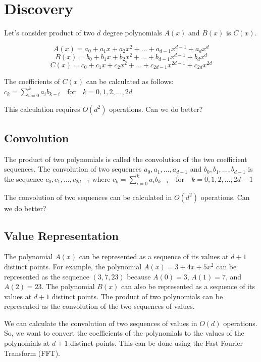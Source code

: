 \documentclass{report}
\begin{document}
\tableofcontents

\newpage
\chapter{Discovery}
Let's consider product of two \(d\) degree polynomials \(A(x)\) and \(B(x)\) is \(C(x)\).

$$
A(x) = a_0 + a_1x + a_2x^2 + \ldots + a_{d-1}x^{d-1} + a_dx^d 
$$	
$$ B(x) = b_0 + b_1x + b_2x^2 + \ldots + b_{d-1}x^{d-1} + b_dx^d $$
$$ C(x) = c_0 + c_1x + c_2x^2 + \ldots + c_{2d-1}x^{2d-1} + c_{2d}x^{2d} $$

The coefficients of \(C(x)\) can be calculated as follows:
\begin{math}
	c_k = \sum_{i=0}^{k} a_ib_{k-i} \quad \text{for} \quad k = 0, 1, 2, \ldots, 2d
\end{math}

This calculation requires \(O(d^2)\) operations. Can we do better?

\section{Convolution}
The product of two polynomials is called the convolution of the two coefficient sequences. The convolution of two sequences \(a_0, a_1, \ldots, a_{d-1}\) and \(b_0, b_1, \ldots, b_{d-1}\) is the sequence \(c_0, c_1, \ldots, c_{2d-1}\) where
\begin{math}
	c_k = \sum_{i=0}^{k} a_ib_{k-i} \quad \text{for} \quad k = 0, 1, 2, \ldots, 2d-1
\end{math}

The convolution of two sequences can be calculated in \(O(d^2)\) operations. Can we do better?

\section{Value  Representation}

The polynomial \(A(x)\) can be represented as a sequence of its values at \(d+1\) distinct points. For example, the polynomial \(A(x) = 3 + 4x + 5x^2\) can be represented as the sequence \((3, 7, 23)\) because \(A(0) = 3\), \(A(1) = 7\), and \(A(2) = 23\). The polynomial \(B(x)\) can also be represented as a sequence of its values at \(d+1\) distinct points. The product of two polynomials can be represented as the convolution of the two sequences of values.

We can calculate the convolution of two sequences of values in \(O(d)\) operations. So, we want to convert the coefficients of the polynomials to the values of the polynomials at \(d+1\) distinct points. This can be done using the Fast Fourier Transform (FFT).
\end{document}
